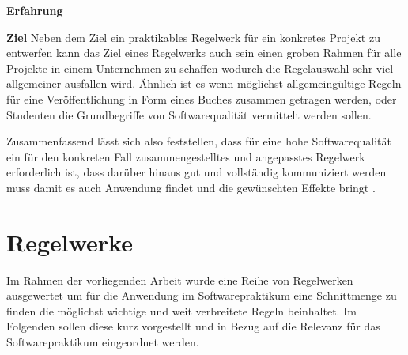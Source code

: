 \documentclass[da,ngerman]{stthesis}
\begin{document}
\begin{labeling}{\textbf{Erfahrung}}
				  \item [\textbf{Ziel}] Neben dem Ziel ein praktikables Regelwerk für ein konkretes Projekt zu entwerfen kann das Ziel eines Regelwerks auch sein einen groben Rahmen für alle Projekte in einem Unternehmen zu schaffen wodurch die Regelauswahl sehr viel allgemeiner ausfallen wird. Ähnlich ist es wenn möglichst allgemeingültige Regeln für eine Veröffentlichung in Form eines Buches zusammen getragen werden, oder Studenten die Grundbegriffe von Softwarequalität vermittelt werden sollen.
			\end{labeling}
			Zusammenfassend lässt sich also feststellen, dass für eine hohe Softwarequalität ein für den konkreten Fall zusammengestelltes und angepasstes Regelwerk erforderlich ist, dass darüber hinaus gut und vollständig kommuniziert werden muss damit es auch Anwendung findet und die gewünschten Effekte bringt \cite{ImproveCodeQuality}.
		\section{Regelwerke}
			Im Rahmen der vorliegenden Arbeit wurde eine Reihe von Regelwerken ausgewertet um für die Anwendung im Softwarepraktikum eine Schnittmenge zu finden die möglichst wichtige und weit verbreitete Regeln beinhaltet. Im Folgenden sollen diese kurz vorgestellt und in Bezug auf die Relevanz für das Softwarepraktikum eingeordnet werden.
\end{document}
